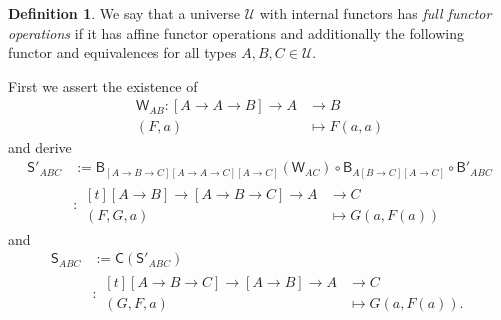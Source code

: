 \documentclass[a4paper]{article}
\theoremstyle{definition}
\newtheorem{definition}{Definition}[section]
\theoremstyle{remark}
\newcommand{\defn}{\emph}
\newcommand{\U}{\mathcal{U}}
\newcommand{\nm}{\mathsf}
\newcommand{\combinator}{\nm}
\newcommand{\compFun}{\combinator{B'}}
\newcommand{\revCompFun}{\combinator{B}}
\newcommand{\swapFun}{\combinator{C}}
\newcommand{\dupFun}{\combinator{W}}
\newcommand{\substFun}{\combinator{S'}}
\newcommand{\revSubstFun}{\combinator{S}}
\begin{document}
\begin{definition}
  We say that a universe $\U$ with internal functors has \defn{full functor
  operations} if it has affine functor operations and additionally the following functor
  and equivalences for all types $A,B,C \in \U.$

  First we assert the existence of
  \begin{align*}
    \dupFun_{AB} : [A \to A \to B] \to A &\to     B\\
                   (F,a)                 &\mapsto F(a,a)
  \end{align*}
  and derive
  \begin{align*}
    \substFun_{ABC} &:= \revCompFun_{[A{\to}B{\to}C][A{\to}A{\to}C][A{\to}C]}(\dupFun_{AC}) \circ
                        \revCompFun_{A[B{\to}C][A{\to}C]} \circ
                        \compFun_{ABC}\\
                    &: \begin{aligned}[t]
                         [A \to B] \to [A \to B \to C] \to A &\to     C\\
                         (F,G,a)                             &\mapsto G(a,F(a))
                       \end{aligned}
  \end{align*}
  and
  \begin{align*}
    \revSubstFun_{ABC} &:= \swapFun(\substFun_{ABC})\\
                       &: \begin{aligned}[t]
                            [A \to B \to C] \to [A \to B] \to A &\to     C\\
                            (G,F,a)                             &\mapsto G(a,F(a)).
                          \end{aligned}
  \end{align*}


\end{definition}
\end{document}

